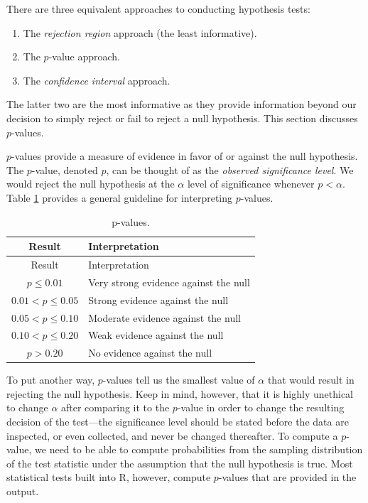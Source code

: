 \documentclass[]{book}
\theoremstyle{definition}
\theoremstyle{definition}
\theoremstyle{definition}
\theoremstyle{remark}
\begin{document}
There are three equivalent approaches to conducting hypothesis tests:

\begin{enumerate}
\def\labelenumi{\arabic{enumi}.}
\item
  The \emph{rejection region} approach (the least informative).
\item
  The \(p\)-value approach.
\item
  The \emph{confidence interval} approach.
\end{enumerate}

The latter two are the most informative as they provide information
beyond our decision to simply reject or fail to reject a null
hypothesis. This section discusses \(p\)-values.

\(p\)-values provide a measure of evidence in favor of or against the
null hypothesis. The \(p\)-value, denoted \(p\), can be thought of as
the \emph{observed significance level}. We would reject the null
hypothesis at the \(\alpha\) level of significance whenever
\(p < \alpha\). Table \ref{tab:p-values} provides a general guideline
for interpreting \(p\)-values.

\begin{longtable}[]{@{}cl@{}}
\caption{\label{tab:p-values} p-values.}\tabularnewline
\toprule
Result & Interpretation\tabularnewline
\midrule
\endfirsthead
\toprule
Result & Interpretation\tabularnewline
\midrule
\endhead
\(p \le 0.01\) & Very strong evidence against the null\tabularnewline
\(0.01 < p \le 0.05\) & Strong evidence against the null\tabularnewline
\(0.05 < p \le 0.10\) & Moderate evidence against the
null\tabularnewline
\(0.10 < p \le 0.20\) & Weak evidence against the null\tabularnewline
\(p > 0.20\) & No evidence against the null\tabularnewline
\bottomrule
\end{longtable}

To put another way, \(p\)-values tell us the smallest value of
\(\alpha\) that would result in rejecting the null hypothesis. Keep in
mind, however, that it is highly unethical to change \(\alpha\) after
comparing it to the \(p\)-value in order to change the resulting
decision of the test---the significance level should be stated before
the data are inspected, or even collected, and never be changed
thereafter. To compute a \(p\)-value, we need to be able to compute
probabilities from the sampling distribution of the test statistic under
the assumption that the null hypothesis is true. Most statistical tests
built into R, however, compute \(p\)-values that are provided in the
output.
\end{document}
